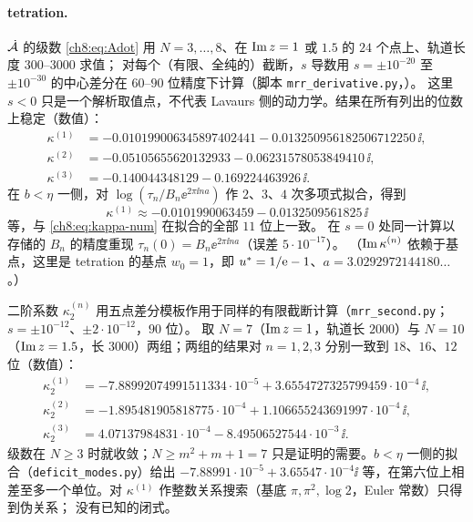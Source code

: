 \paragraph{tetration.}
$\dot{\mathcal A}$ 的级数 \eqref{ch8:eq:Adot} 用 $N=3,\dots,8$、在 $\operatorname{Im} z=1$ 或 $1.5$ 的 $24$ 个点上、轨道长度 $300$--$3000$ 求值；
对每个（有限、全纯的）截断，$s$ 导数用 $s=\pm10^{-20}$ 至 $\pm10^{-30}$ 的中心差分在 $60$--$90$ 位精度下计算（脚本 \texttt{mrr\_derivative.py}，\cite[§5.6]{KneserPaper}）。
这里 $s<0$ 只是一个解析取值点，不代表 Lavaurs 侧的动力学。结果在所有列出的位数上稳定（数值）：
\begin{equation}\label{ch8:eq:kappa-num}
\begin{aligned}
 \kappa^{(1)}&=-0.010199006345897402441-0.013250956182506712250\,\ii,\\
 \kappa^{(2)}&=-0.05105655620132933-0.06231578053849410\,\ii,\\
 \kappa^{(3)}&=-0.140044348129-0.169224463926\,\ii .
\end{aligned}
\end{equation}
在 $b<\eta$ 一侧，对 $\log(\tau_n/B_n\ee^{2\pi\ii na})$ 作 $2$、$3$、$4$ 次多项式拟合，得到
\[
 \kappa^{(1)}\approx-0.0101990063459-0.0132509561825\,\ii
\]
等，与 \eqref{ch8:eq:kappa-num} 在拟合的全部 $11$ 位上一致。
在 $s=0$ 处同一计算以存储的 $B_n$ 的精度重现 $\tau_n(0)=B_n\ee^{2\pi\ii na}$（误差 $5\cdot10^{-17}$）。
（$\operatorname{Im}\kappa^{(n)}$ 依赖于基点，这里是 tetration 的基点 $w_0=1$，即 $u^{*}=1/\mathrm{e}-1$、$a=3.0292972144180\ldots$。）

二阶系数 $\kappa^{(n)}_2$ 用五点差分模板作用于同样的有限截断计算（\texttt{mrr\_second.py}；$s=\pm10^{-12}$、$\pm2\cdot10^{-12}$，$90$ 位）。
取 $N=7$（$\operatorname{Im} z=1$，轨道长 $2000$）与 $N=10$（$\operatorname{Im} z=1.5$，长 $3000$）两组；两组的结果对 $n=1,2,3$ 分别一致到 $18$、$16$、$12$ 位（数值）：
\[
\begin{aligned}
 \kappa^{(1)}_2&=-7.88992074991511334\cdot10^{-5}+3.6554727325799459\cdot10^{-4}\,\ii,\\
 \kappa^{(2)}_2&=-1.895481905818775\cdot10^{-4}+1.106655243691997\cdot10^{-4}\,\ii,\\
 \kappa^{(3)}_2&=4.07137984831\cdot10^{-4}-8.49506527544\cdot10^{-3}\,\ii .
\end{aligned}
\]
级数在 $N\ge3$ 时就收敛；$N\ge m^2+m+1=7$ 只是证明的需要。$b<\eta$ 一侧的拟合（\texttt{deficit\_modes.py}）给出
$-7.88991\cdot10^{-5}+3.65547\cdot10^{-4}\ii$ 等，在第六位上相差至多一个单位。对 $\kappa^{(1)}$ 作整数关系搜索（基底 $\pi,\pi^2,\log2$，Euler 常数）只得到伪关系；
没有已知的闭式。

